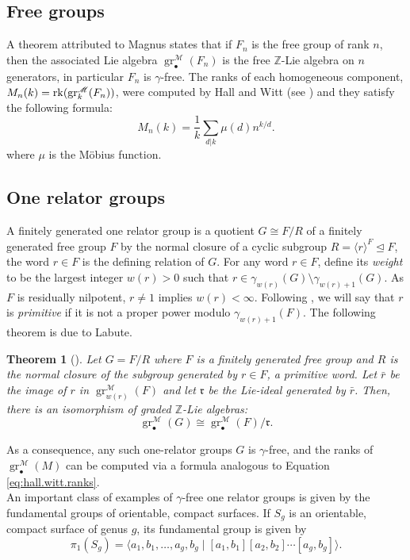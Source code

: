 \documentclass{amsart}
\theoremstyle{plain}
\newtheorem{theorem}{Theorem}
\theoremstyle{definition}
\numberwithin{theorem}{section}
\numberwithin{equation}{section}
\newcommand{\grM}{\operatorname{gr}^{\mathscr M}}
\newcommand{\Z}{\mathbb Z}
\begin{document}
\subsection{Free groups}
A theorem attributed to Magnus states that if $F_n$ is the free group of rank $n$, then the associated Lie algebra $\grM_\bullet(F_n)$ is the free $\Z$-Lie algebra on $n$ generators, in particular $F_n$ is $\gamma$-free. The ranks of each homogeneous component, $M_n(k) = {\rm rk}(\grM_k(F_n))$, were computed by Hall and Witt (see \cite{Bou89}) and they satisfy the following formula:
\begin{equation}\label{eq:hall.witt.ranks}
	M_n(k) = \frac{1}{k} \sum_{d | k} \mu(d) n^{k/d}.
\end{equation}
where $\mu$ is the M\"obius function.
\subsection{One relator groups}
A finitely generated one relator group is a quotient $G \cong F/R$ of a finitely generated free group $F$ by the normal closure of a cyclic subgroup $R = \langle r \rangle^F \unlhd F$, the word $r \in F$ is the defining relation of $G$. For any word $r \in F$, define its \emph{weight} to be the largest integer $w(r) > 0$ such that $r \in \gamma_{w(r)}(G) \setminus \gamma_{w(r)+1}(G)$. As $F$ is residually nilpotent, $r \neq 1$ implies $w(r) < \infty$. Following \cite{Lab70}, we will say that $r$ is \emph{primitive} if it is not a proper power modulo $\gamma_{w(r)+1}(F)$. The following theorem is due to Labute. 
\begin{theorem}[{\cite{Lab70}}]
	Let $G = F/R$ where $F$ is a finitely generated free group and $R$ is the normal closure of the subgroup generated by $r \in F$, a primitive word. Let $\bar{r}$ be the image of $r$ in $\grM_{w(r)}(F)$ and let $\mathfrak r$ be the Lie-ideal generated by $\bar{r}$. Then, there is an isomorphism of graded $\Z$-Lie algebras: $$\grM_\bullet(G) \cong \grM_\bullet(F)/\mathfrak r.$$ 
\end{theorem}

As a consequence, any such one-relator groups $G$ is $\gamma$-free, and the ranks of $\grM_\bullet(M)$ can be computed via a formula analogous to Equation \eqref{eq:hall.witt.ranks}. \\
\noindent
An important class of examples of $\gamma$-free one relator groups is given by the fundamental groups of orientable, compact surfaces. If $S_g$ is an orientable, compact surface of genus $g$, its fundamental group is given by 
\begin{equation}
    \pi_1(S_g) = \langle a_1, b_1, \dots, a_g, b_g \mid [a_1, b_1][a_2, b_2] \cdots [a_g, b_g]  \rangle.
\end{equation}
\end{document}
